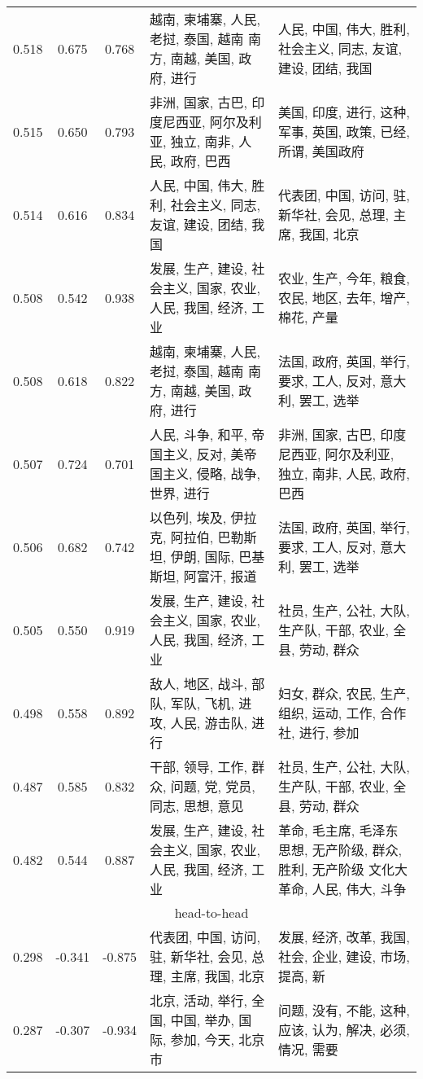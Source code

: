 \begin{tabular}{cccp{5cm}p{5cm}}
0.518 & 0.675 & 0.768 & 越南, 柬埔寨, 人民, 老挝, 泰国, 越南 南方, 南越, 美国, 政府, 进行 & 人民, 中国, 伟大, 胜利, 社会主义, 同志, 友谊, 建设, 团结, 我国 \\
0.515 & 0.650 & 0.793 & 非洲, 国家, 古巴, 印度尼西亚, 阿尔及利亚, 独立, 南非, 人民, 政府, 巴西 & 美国, 印度, 进行, 这种, 军事, 英国, 政策, 已经, 所谓, 美国政府 \\
0.514 & 0.616 & 0.834 & 人民, 中国, 伟大, 胜利, 社会主义, 同志, 友谊, 建设, 团结, 我国 & 代表团, 中国, 访问, 驻, 新华社, 会见, 总理, 主席, 我国, 北京 \\
0.508 & 0.542 & 0.938 & 发展, 生产, 建设, 社会主义, 国家, 农业, 人民, 我国, 经济, 工业 & 农业, 生产, 今年, 粮食, 农民, 地区, 去年, 增产, 棉花, 产量 \\
0.508 & 0.618 & 0.822 & 越南, 柬埔寨, 人民, 老挝, 泰国, 越南 南方, 南越, 美国, 政府, 进行 & 法国, 政府, 英国, 举行, 要求, 工人, 反对, 意大利, 罢工, 选举 \\
0.507 & 0.724 & 0.701 & 人民, 斗争, 和平, 帝国主义, 反对, 美帝国主义, 侵略, 战争, 世界, 进行 & 非洲, 国家, 古巴, 印度尼西亚, 阿尔及利亚, 独立, 南非, 人民, 政府, 巴西 \\
0.506 & 0.682 & 0.742 & 以色列, 埃及, 伊拉克, 阿拉伯, 巴勒斯坦, 伊朗, 国际, 巴基斯坦, 阿富汗, 报道 & 法国, 政府, 英国, 举行, 要求, 工人, 反对, 意大利, 罢工, 选举 \\
0.505 & 0.550 & 0.919 & 发展, 生产, 建设, 社会主义, 国家, 农业, 人民, 我国, 经济, 工业 & 社员, 生产, 公社, 大队, 生产队, 干部, 农业, 全县, 劳动, 群众 \\
0.498 & 0.558 & 0.892 & 敌人, 地区, 战斗, 部队, 军队, 飞机, 进攻, 人民, 游击队, 进行 & 妇女, 群众, 农民, 生产, 组织, 运动, 工作, 合作社, 进行, 参加 \\
0.487 & 0.585 & 0.832 & 干部, 领导, 工作, 群众, 问题, 党, 党员, 同志, 思想, 意见 & 社员, 生产, 公社, 大队, 生产队, 干部, 农业, 全县, 劳动, 群众 \\
0.482 & 0.544 & 0.887 & 发展, 生产, 建设, 社会主义, 国家, 农业, 人民, 我国, 经济, 工业 & 革命, 毛主席, 毛泽东思想, 无产阶级, 群众, 胜利, 无产阶级 文化大革命, 人民, 伟大, 斗争 \\
\midrule
\multicolumn{5}{c}{head-to-head}\\
0.298 & -0.341 & -0.875 & 代表团, 中国, 访问, 驻, 新华社, 会见, 总理, 主席, 我国, 北京 & 发展, 经济, 改革, 我国, 社会, 企业, 建设, 市场, 提高, 新 \\
0.287 & -0.307 & -0.934 & 北京, 活动, 举行, 全国, 中国, 举办, 国际, 参加, 今天, 北京市 & 问题, 没有, 不能, 这种, 应该, 认为, 解决, 必须, 情况, 需要 \\

\end{tabular}
